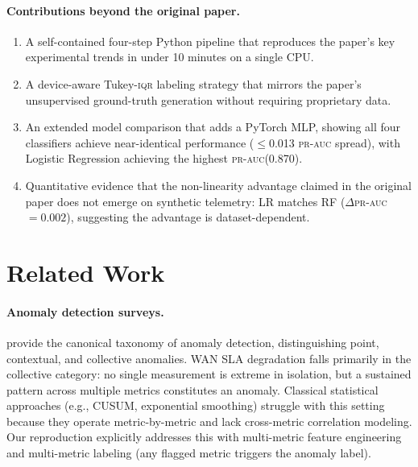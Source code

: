 \documentclass{article}
\newcommand{\prauc}{\textsc{pr-auc}\xspace}
\newcommand{\iqr}{\textsc{iqr}\xspace}
\begin{document}
\paragraph{Contributions beyond the original paper.}
\begin{enumerate}
  \item A self-contained four-step Python pipeline that reproduces the paper's
        key experimental trends in under 10 minutes on a single CPU.
  \item A device-aware Tukey-\iqr labeling strategy that mirrors the paper's
        unsupervised ground-truth generation without requiring proprietary data.
  \item An extended model comparison that adds a PyTorch MLP, showing all four
        classifiers achieve near-identical performance ($\leq$0.013 \prauc spread),
        with Logistic Regression achieving the highest \prauc (0.870).
  \item Quantitative evidence that the non-linearity advantage claimed in the original
        paper does not emerge on synthetic telemetry: LR matches RF ($\Delta$\prauc $=
        0.002$), suggesting the advantage is dataset-dependent.
\end{enumerate}

\section{Related Work}
\label{sec:related}

\paragraph{Anomaly detection surveys.}
\citet{chandola2009} provide the canonical taxonomy of anomaly
detection, distinguishing point, contextual, and collective anomalies.
WAN SLA degradation falls primarily in the collective category: no single
measurement is extreme in isolation, but a sustained pattern across multiple
metrics constitutes an anomaly.
Classical statistical approaches (e.g., CUSUM, exponential smoothing) struggle
with this setting because they operate metric-by-metric and lack cross-metric
correlation modeling.
Our reproduction explicitly addresses this with multi-metric feature engineering
and multi-metric labeling (any flagged metric triggers the anomaly label).
\end{document}
